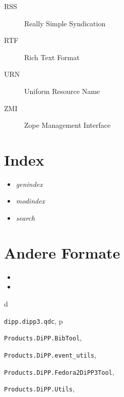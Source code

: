\documentclass[a4paper,10pt,ngerman]{sphinxmanual}
\begin{document}
\begin{description}
\item[{RSS}] \leavevmode{}\label{glossar:term-rss}
Really Simple Syndication

\item[{RTF}] \leavevmode{}\label{glossar:term-rtf}
Rich Text Format

\item[{URN}] \leavevmode{}\label{glossar:term-urn}
Uniform Resource Name

\item[{ZMI}] \leavevmode{}\label{glossar:term-zmi}
Zope Management Interface

\end{description}


\part{Index}
\label{index:index}\begin{itemize}
\item {} 
\emph{genindex}

\item {} 
\emph{modindex}

\item {} 
\emph{search}

\end{itemize}


\part{Andere Formate}
\label{index:andere-formate}\begin{itemize}
\item {} 

\item {} 

\end{itemize}


\renewcommand{\indexname}{Python-Modulindex}
\begin{theindex}
\def\bigletter#1{{\Large\sffamily#1}\nopagebreak\vspace{1mm}}
\bigletter{d}
\item {\texttt{dipp.dipp3.qdc}}, \pageref{modules:module-dipp.dipp3.qdc}
\indexspace
\bigletter{p}
\item {\texttt{Products.DiPP.BibTool}}, \pageref{tools:module-Products.DiPP.BibTool}
\item {\texttt{Products.DiPP.event\_utils}}, \pageref{tools:module-Products.DiPP.event_utils}
\item {\texttt{Products.DiPP.Fedora2DiPP3Tool}}, \pageref{tools:module-Products.DiPP.Fedora2DiPP3Tool}
\item {\texttt{Products.DiPP.Utils}}, \pageref{tools:module-Products.DiPP.Utils}
\end{theindex}

\renewcommand{\indexname}{Stichwortverzeichnis}
\printindex
\end{document}
